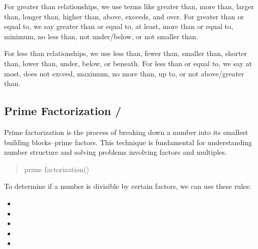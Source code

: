 For greater than relationships, we use terms like greater than, more than, larger than, longer than, higher than, above, exceeds, and over. For greater than or equal to, we say greater than or equal to, at least, more than or equal to, minimum, no less than, not under/below, or not smaller than.

For less than relationships, we use less than, fewer than, smaller than, shorter than, lower than, under, below, or beneath. For less than or equal to, we say at most, does not exceed, maximum, no more than, up to, or not above/greater than.

\blockquote{}

\blockquote{}

\newpage
\subsection{Prime Factorization / }

Prime factorization is the process of breaking down a number into its smallest building blocks--prime factors. This technique is fundamental for understanding number structure and solving problems involving factors and multiples.

\blockquote{prime factorization() }

\blockquote{}

\blockquote{}

To determine if a number is divisible by certain factors, we can use these rules:
\begin{itemize}
  \item {}
  \item {}
  \item {}
  \item {}
  \item {}
\end{itemize}

\blockquote{}


